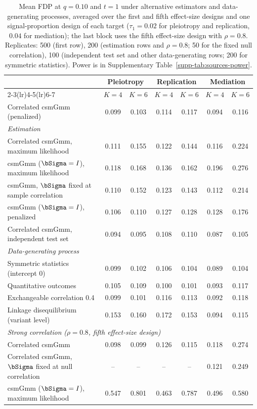 \begin{table}[!htbp]
\centering
\caption{Mean FDP at $q=0.10$ and $t=1$ under alternative estimators and data-generating processes, averaged over the first and fifth effect-size designs and one signal-proportion design of each target ($\tau_1=0.02$ for pleiotropy and replication, $0.04$ for mediation); the last block uses the fifth effect-size design with $\rho=0.8$. Replicates: 500 (first row), 200 (estimation rows and $\rho=0.8$; 50 for the fixed null correlation), 100 (independent test set and other data-generating rows; 200 for symmetric statistics). Power is in Supplementary Table~\ref{supp-tab:sources-power}.}\label{tab:sources}
\small
\begin{tabular}{l cc cc cc}
\toprule
 & \multicolumn{2}{c}{Pleiotropy} & \multicolumn{2}{c}{Replication} & \multicolumn{2}{c}{Mediation}\\
\cmidrule(lr){2-3}\cmidrule(lr){4-5}\cmidrule(lr){6-7}
 & $K=4$ & $K=6$ & $K=4$ & $K=6$ & $K=4$ & $K=6$\\
\midrule
Correlated csmGmm (penalized) & 0.099 & 0.103 & 0.114 & 0.117 & 0.094 & 0.116\\
\multicolumn{7}{l}{\textit{Estimation}}\\
\quad Correlated csmGmm, maximum likelihood & 0.111 & 0.155 & 0.122 & 0.144 & 0.116 & 0.224\\
\quad csmGmm ($\bSigma=I$), maximum likelihood & 0.118 & 0.168 & 0.136 & 0.162 & 0.196 & 0.276\\
\quad csmGmm, $\bSigma$ fixed at sample correlation & 0.110 & 0.152 & 0.123 & 0.143 & 0.112 & 0.214\\
\quad csmGmm ($\bSigma=I$), penalized & 0.106 & 0.110 & 0.127 & 0.128 & 0.128 & 0.176\\
\quad Correlated csmGmm, independent test set & 0.094 & 0.095 & 0.108 & 0.110 & 0.087 & 0.105\\
\multicolumn{7}{l}{\textit{Data-generating process}}\\
\quad Symmetric statistics (intercept 0) & 0.099 & 0.102 & 0.106 & 0.104 & 0.089 & 0.104\\
\quad Quantitative outcomes & 0.105 & 0.109 & 0.100 & 0.101 & 0.093 & 0.117\\
\quad Exchangeable correlation 0.4 & 0.099 & 0.101 & 0.116 & 0.113 & 0.092 & 0.118\\
\quad Linkage disequilibrium (variant level) & 0.153 & 0.160 & 0.172 & 0.153 & 0.094 & 0.115\\
\multicolumn{7}{l}{\textit{Strong correlation ($\rho=0.8$, fifth effect-size design)}}\\
\quad Correlated csmGmm & 0.098 & 0.099 & 0.126 & 0.115 & 0.118 & 0.274\\
\quad Correlated csmGmm, $\bSigma$ fixed at null correlation & -- & -- & -- & -- & 0.121 & 0.249\\
\quad csmGmm ($\bSigma=I$), maximum likelihood & 0.547 & 0.801 & 0.463 & 0.787 & 0.496 & 0.580\\
\bottomrule
\end{tabular}
\end{table}

